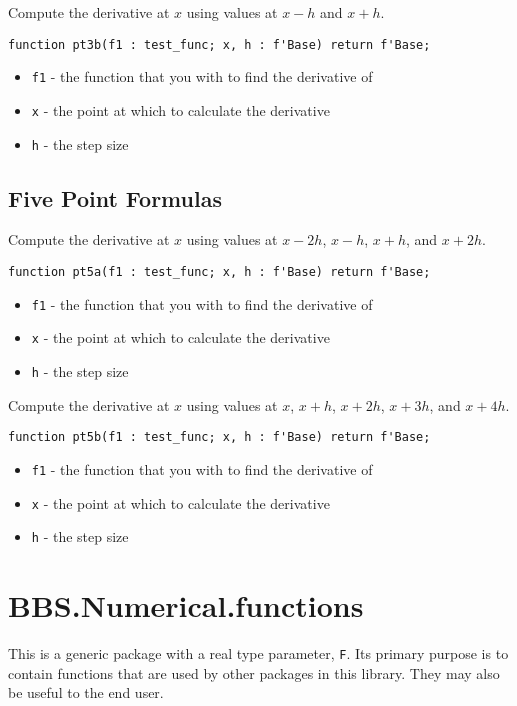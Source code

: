 \documentclass[10pt, openany]{book}
\newcommand{\function}[1]{\texttt{#1}}
\newcommand{\datatype}[1]{\texttt{#1}}
\begin{document}
Compute the derivative at $x$ using values at $x-h$ and $x+h$.
\begin{lstlisting}
function pt3b(f1 : test_func; x, h : f'Base) return f'Base;
\end{lstlisting}
\begin{itemize}
  \item \function{f1} - the function that you with to find the derivative of
  \item \function{x} - the point at which to calculate the derivative
  \item \function{h} - the step size
\end{itemize}

\subsection{Five Point Formulas}

Compute the derivative at $x$ using values at $x-2h$, $x-h$, $x+h$, and $x+2h$.
\begin{lstlisting}
function pt5a(f1 : test_func; x, h : f'Base) return f'Base;
\end{lstlisting}
\begin{itemize}
  \item \function{f1} - the function that you with to find the derivative of
  \item \function{x} - the point at which to calculate the derivative
  \item \function{h} - the step size
\end{itemize}

Compute the derivative at $x$ using values at $x$, $x+h$, $x+2h$, $x+3h$, and $x+4h$.
\begin{lstlisting}
function pt5b(f1 : test_func; x, h : f'Base) return f'Base;
\end{lstlisting}
\begin{itemize}
  \item \function{f1} - the function that you with to find the derivative of
  \item \function{x} - the point at which to calculate the derivative
  \item \function{h} - the step size
\end{itemize}

\section{BBS.Numerical.functions}
This is a generic package with a real type parameter, \datatype{F}.  Its primary purpose is to contain functions that are used by other packages in this library.  They may also be useful to the end user.
\end{document}
